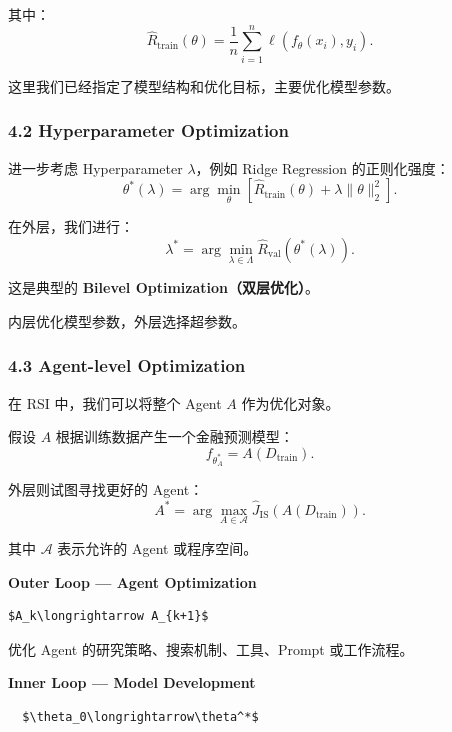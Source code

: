 其中：
\[\widehat R_{\mathrm{train}}(\theta)
=
\frac{1}{n}
\sum_{i=1}^{n}
\ell(f_\theta(x_i),y_i).\]

这里我们已经指定了模型结构和优化目标，主要优化模型参数。

\hypertarget{part-1-07-0001-hyperparameter-optimization}{%
\subsubsection{4.2 Hyperparameter Optimization}\label{part-1-07-0001-hyperparameter-optimization}}

进一步考虑 Hyperparameter \(\lambda\)，例如 Ridge Regression 的正则化强度：
\[\theta^*(\lambda)
=
\arg\min_\theta
\left[
\widehat R_{\mathrm{train}}(\theta)
+
\lambda\|\theta\|_2^2
\right].\]

在外层，我们进行：
\[\lambda^*
=
\arg\min_{\lambda\in\Lambda}
\widehat R_{\mathrm{val}}
\left(\theta^*(\lambda)\right).\]

这是典型的 \textbf{Bilevel Optimization（双层优化）}。

内层优化模型参数，外层选择超参数。

\hypertarget{part-1-07-0001-agent-level-optimization}{%
\subsubsection{4.3 Agent-level Optimization}\label{part-1-07-0001-agent-level-optimization}}

在 RSI 中，我们可以将整个 Agent \(A\) 作为优化对象。

假设 \(A\) 根据训练数据产生一个金融预测模型：
\[f_{\theta_A^*}=A(D_{\mathrm{train}}).\]

外层则试图寻找更好的 Agent：
\[A^*
=
\arg\max_{A\in\mathcal A}
\widehat J_{\mathrm{IS}}
\left(A(D_{\mathrm{train}})\right).\]

其中 \(\mathcal A\) 表示允许的 Agent 或程序空间。

\textbf{Outer Loop --- Agent Optimization}

\begin{verbatim}
$A_k\longrightarrow A_{k+1}$
\end{verbatim}

优化 Agent 的研究策略、搜索机制、工具、Prompt 或工作流程。

\textbf{Inner Loop --- Model Development}

\begin{verbatim}
  $\theta_0\longrightarrow\theta^*$
\end{verbatim}

